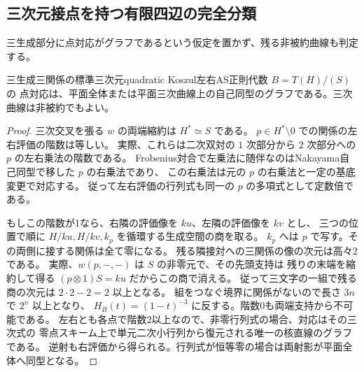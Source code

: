 \subsection{三次元接点を持つ有限四辺の完全分類}
\label{sec:maximal-tangent-classification}
三生成部分に点対応がグラフであるという仮定を置かず、残る非被約曲線も判定する。

\begin{lemma}\label{lem:ternary-point-graph-growth}
三生成三関係の標準三次元quadratic Koszul左右AS正則代数 $B=T(H)/(S)$ の
点対応は、平面全体または平面三次曲線上の自己同型のグラフである。三次曲線は非被約でもよい。
\end{lemma}
\begin{proof}
三次交叉を張る $w$ の両端縮約は $H^*\simeq S$ である。
$p\in H^*\setminus0$ での関係の左右評価の階数は等しい。
実際、これらは二次双対の $1$ 次部分から $2$ 次部分への $p$ の左右乗法の階数である。
Frobenius対合で左乗法に随伴なのはNakayama自己同型で移した $p$ の右乗法であり、
この右乗法は元の $p$ の右乗法と一定の基底変更で対応する。
従って左右評価の行列式も同一の $p$ の多項式として定数倍である。

もしこの階数が1なら、右隣の評価像を $ku$、左隣の評価像を $kv$ とし、
三つの位置で順に $H/ku,H/kv,k_p$ を循環する生成空間の商を取る。
$k_p$ へは $p$ で写す。その両側に接する関係は全て零になる。
残る隣接対への三関係の像の次元は高々2である。
実際、$w(p,-,-)$ は $S$ の非零元で、その先頭支持は
残りの末端を縮約して得る $(p\otimes1)S=ku$ だからこの商で消える。
従って三文字の一組で残る商の次元は $2\cdot2-2=2$ 以上となる。
組をつなぐ境界に関係がないので長さ $3n$ で $2^n$ 以上となり、
$H_B(t)=(1-t)^{-3}$ に反する。階数0も両端支持から不可能である。
左右とも各点で階数2以上なので、非零行列式の場合、対応はその三次式の
零点スキーム上で単元二次小行列から復元される唯一の核直線のグラフである。
逆射も右評価から得られる。行列式が恒等零の場合は両射影が平面全体へ同型となる。
\end{proof}

